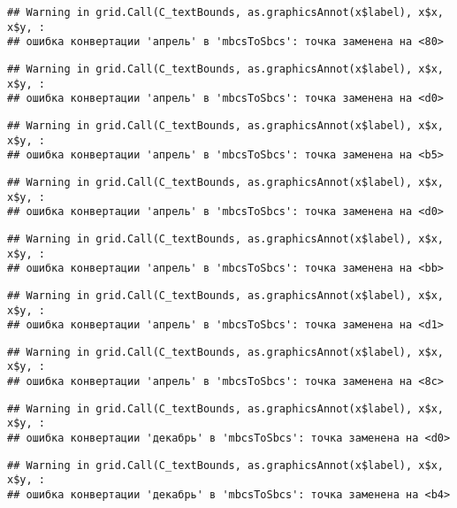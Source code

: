 \documentclass[
]{article}
\begin{document}
\begin{verbatim}
## Warning in grid.Call(C_textBounds, as.graphicsAnnot(x$label), x$x, x$y, :
## ошибка конвертации 'апрель' в 'mbcsToSbcs': точка заменена на <80>
\end{verbatim}

\begin{verbatim}
## Warning in grid.Call(C_textBounds, as.graphicsAnnot(x$label), x$x, x$y, :
## ошибка конвертации 'апрель' в 'mbcsToSbcs': точка заменена на <d0>
\end{verbatim}

\begin{verbatim}
## Warning in grid.Call(C_textBounds, as.graphicsAnnot(x$label), x$x, x$y, :
## ошибка конвертации 'апрель' в 'mbcsToSbcs': точка заменена на <b5>
\end{verbatim}

\begin{verbatim}
## Warning in grid.Call(C_textBounds, as.graphicsAnnot(x$label), x$x, x$y, :
## ошибка конвертации 'апрель' в 'mbcsToSbcs': точка заменена на <d0>
\end{verbatim}

\begin{verbatim}
## Warning in grid.Call(C_textBounds, as.graphicsAnnot(x$label), x$x, x$y, :
## ошибка конвертации 'апрель' в 'mbcsToSbcs': точка заменена на <bb>
\end{verbatim}

\begin{verbatim}
## Warning in grid.Call(C_textBounds, as.graphicsAnnot(x$label), x$x, x$y, :
## ошибка конвертации 'апрель' в 'mbcsToSbcs': точка заменена на <d1>
\end{verbatim}

\begin{verbatim}
## Warning in grid.Call(C_textBounds, as.graphicsAnnot(x$label), x$x, x$y, :
## ошибка конвертации 'апрель' в 'mbcsToSbcs': точка заменена на <8c>
\end{verbatim}

\begin{verbatim}
## Warning in grid.Call(C_textBounds, as.graphicsAnnot(x$label), x$x, x$y, :
## ошибка конвертации 'декабрь' в 'mbcsToSbcs': точка заменена на <d0>
\end{verbatim}

\begin{verbatim}
## Warning in grid.Call(C_textBounds, as.graphicsAnnot(x$label), x$x, x$y, :
## ошибка конвертации 'декабрь' в 'mbcsToSbcs': точка заменена на <b4>
\end{verbatim}
\end{document}
